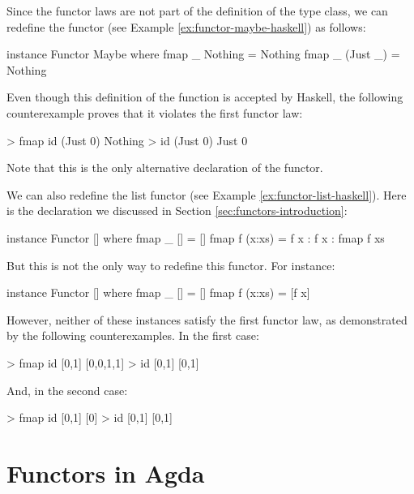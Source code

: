 \begin{example}
  \label{ex:functor-bad-maybe-haskell}

  Since the functor laws are not part of the definition of the
   type class, we can redefine the
   functor (see Example
  \ref{ex:functor-maybe-haskell}) as follows:
  \begin{codehaskell}
instance Functor Maybe where
  fmap _ Nothing  = Nothing
  fmap _ (Just _) = Nothing
  \end{codehaskell}
  Even though this definition of the  function is
  accepted by Haskell, the following counterexample proves that it
  violates the first functor law:
  \begin{codehaskell}
> fmap id (Just 0)
Nothing
> id (Just 0)
Just 0
  \end{codehaskell}
  Note that this is the only alternative declaration of the
   functor.

\end{example}

\begin{example}
  \label{ex:functor-bad-list-haskell}

  We can also redefine the list functor (see Example
  \ref{ex:functor-list-haskell}). Here is the declaration we discussed
  in Section \ref{sec:functors-introduction}:
  \begin{codehaskell}
instance Functor [] where
  fmap _ []     = []
  fmap f (x:xs) = f x : f x : fmap f xs
  \end{codehaskell}
  But this is not the only way to redefine this functor. For instance:
  \begin{codehaskell}
instance Functor [] where
  fmap _ []     = []
  fmap f (x:xs) = [f x]
  \end{codehaskell}
  However, neither of these instances satisfy the first functor law,
  as demonstrated by the following counterexamples. In the first case:
  \begin{codehaskell}
> fmap id [0,1]
[0,0,1,1]
> id [0,1]
[0,1]
  \end{codehaskell}
  And, in the second case:
  \begin{codehaskell}
> fmap id [0,1]
[0]
> id [0,1]
[0,1]
  \end{codehaskell}

\end{example}

\section{Functors in Agda}
\label{sec:functors-agda}

